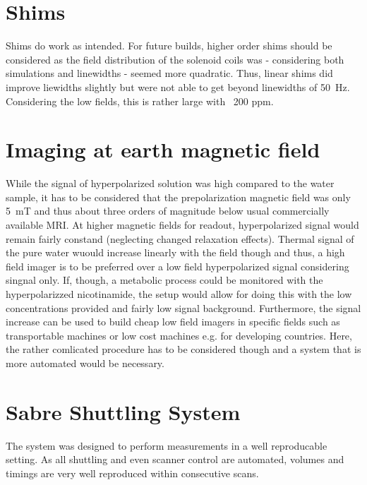     \section{Shims}
        Shims do work as intended. For future builds, higher order shims should be considered as the field distribution of the solenoid coils was - considering both simulations and linewidths - seemed more quadratic. Thus, linear shims did improve liewidths slightly but were not able to get beyond linewidths of \SI{50}{\hertz}. Considering the low fields, this is rather large with ~200 ppm.
    \section{Imaging at earth magnetic field}
        While the signal of hyperpolarized solution was high compared to the water sample, it has to be considered that the prepolarization magnetic field was only \SI{5}{\milli\tesla} and thus about three orders of magnitude below usual commercially available MRI. At higher magnetic fields for readout, hyperpolarized signal would remain fairly constand (neglecting changed relaxation effects). Thermal signal of the pure water wuould increase linearly with the field though and thus, a high field imager is to be preferred over a low field hyperpolarized signal considering singnal only. If, though, a metabolic process could be monitored with the hyperpolarizzed nicotinamide, the setup would allow for doing this with the low concentrations provided and fairly low signal background. Furthermore, the signal increase can be used to build cheap low field imagers in specific fields such as transportable machines or low cost machines e.g. for developing countries. Here, the rather comlicated procedure has to be considered though and a system that is more automated would be necessary.
    \section{Sabre Shuttling System}
        The system was designed to perform measurements in a well reproducable setting. As all shuttling and even scanner control are automated, volumes and timings are very well reproduced within consecutive scans.
